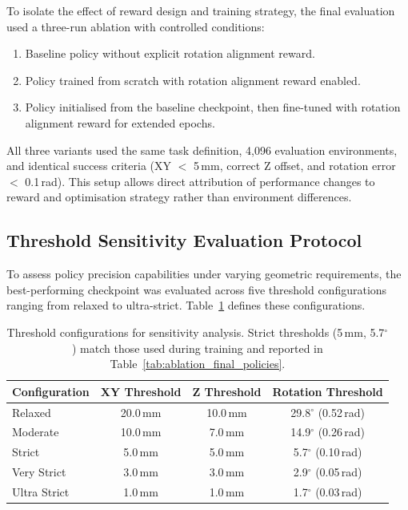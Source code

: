 \documentclass[12pt,a4paper,oneside]{report}
\begin{document}
To isolate the effect of reward design and training strategy, the final evaluation used a three-run ablation with controlled conditions:
\begin{enumerate}
    \item Baseline policy without explicit rotation alignment reward.
    \item Policy trained from scratch with rotation alignment reward enabled.
    \item Policy initialised from the baseline checkpoint, then fine-tuned with rotation alignment reward for extended epochs.
\end{enumerate}

All three variants used the same task definition, 4{,}096 evaluation environments, and identical success criteria (XY $<$ 5\,mm, correct Z offset, and rotation error $<$ 0.1\,rad). This setup allows direct attribution of performance changes to reward and optimisation strategy rather than environment differences.

\subsection{Threshold Sensitivity Evaluation Protocol}

To assess policy precision capabilities under varying geometric requirements, the best-performing checkpoint was evaluated across five threshold configurations ranging from relaxed to ultra-strict. Table~\ref{tab:threshold_configs_method} defines these configurations.

\begin{table}[h]
\centering
\small
\begin{tabular}{|l|c|c|c|}
\hline
\textbf{Configuration} & \textbf{XY Threshold} & \textbf{Z Threshold} & \textbf{Rotation Threshold} \\
\hline
Relaxed & 20.0\,mm & 10.0\,mm & 29.8$^\circ$ (0.52\,rad) \\
Moderate & 10.0\,mm & 7.0\,mm & 14.9$^\circ$ (0.26\,rad) \\
Strict & 5.0\,mm & 5.0\,mm & 5.7$^\circ$ (0.10\,rad) \\
Very Strict & 3.0\,mm & 3.0\,mm & 2.9$^\circ$ (0.05\,rad) \\
Ultra Strict & 1.0\,mm & 1.0\,mm & 1.7$^\circ$ (0.03\,rad) \\
\hline
\end{tabular}
\caption{Threshold configurations for sensitivity analysis. Strict thresholds (5\,mm, 5.7$^\circ$) match those used during training and reported in Table~\ref{tab:ablation_final_policies}.}
\label{tab:threshold_configs_method}
\end{table}
\end{document}
